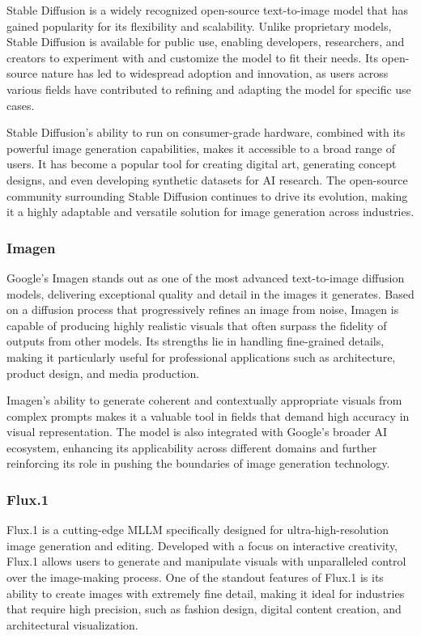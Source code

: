 Stable Diffusion is a widely recognized open-source text-to-image model that has gained popularity for its flexibility and scalability. Unlike proprietary models, Stable Diffusion is available for public use, enabling developers, researchers, and creators to experiment with and customize the model to fit their needs. Its open-source nature has led to widespread adoption and innovation, as users across various fields have contributed to refining and adapting the model for specific use cases.

Stable Diffusion's ability to run on consumer-grade hardware, combined with its powerful image generation capabilities, makes it accessible to a broad range of users. It has become a popular tool for creating digital art, generating concept designs, and even developing synthetic datasets for AI research. The open-source community surrounding Stable Diffusion continues to drive its evolution, making it a highly adaptable and versatile solution for image generation across industries.

\subsubsection{Imagen}

Google's Imagen stands out as one of the most advanced text-to-image diffusion models, delivering exceptional quality and detail in the images it generates. Based on a diffusion process that progressively refines an image from noise, Imagen is capable of producing highly realistic visuals that often surpass the fidelity of outputs from other models. Its strengths lie in handling fine-grained details, making it particularly useful for professional applications such as architecture, product design, and media production.

Imagen's ability to generate coherent and contextually appropriate visuals from complex prompts makes it a valuable tool in fields that demand high accuracy in visual representation. The model is also integrated with Google's broader AI ecosystem, enhancing its applicability across different domains and further reinforcing its role in pushing the boundaries of image generation technology.

\subsubsection{Flux.1}

Flux.1 is a cutting-edge MLLM specifically designed for ultra-high-resolution image generation and editing. Developed with a focus on interactive creativity, Flux.1 allows users to generate and manipulate visuals with unparalleled control over the image-making process. One of the standout features of Flux.1 is its ability to create images with extremely fine detail, making it ideal for industries that require high precision, such as fashion design, digital content creation, and architectural visualization.

